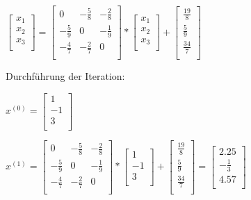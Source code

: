\documentclass{article}
\begin{document}
\(
\begin{bmatrix} 
x_1\\
x_2\\
x_3\\
\end{bmatrix}
=
\begin{bmatrix} 
0 & -\frac{5}{8} & -\frac{2}{8} \\
-\frac{5}{9} & 0 & -\frac{1}{9} \\
-\frac{4}{7} & -\frac{2}{7} & 0 \\
\end{bmatrix}
*
\begin{bmatrix} 
x_1\\
x_2\\
x_3\\
\end{bmatrix}
+
\begin{bmatrix} 
\frac{19}{8}\\
\frac{5}{9}\\
\frac{34}{7}\\
\end{bmatrix}
\)

\vspace{5mm}

Durchführung der Iteration:

\(
x^{(0)} = 
\begin{bmatrix} 
1\\
-1\\
3\\
\end{bmatrix}
\)

\(
x^{(1)} = 
\begin{bmatrix} 
0 & -\frac{5}{8} & -\frac{2}{8} \\
-\frac{5}{9} & 0 & -\frac{1}{9} \\
-\frac{4}{7} & -\frac{2}{7} & 0 \\
\end{bmatrix}
*
\begin{bmatrix} 
1\\
-1\\
3\\
\end{bmatrix}
+
\begin{bmatrix} 
\frac{19}{8}\\
\frac{5}{9}\\
\frac{34}{7}\\
\end{bmatrix}
=
\begin{bmatrix} 
2.25\\
-\frac{1}{3}\\
4.57\\
\end{bmatrix}
\)
\end{document}
